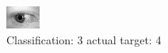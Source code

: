 \begin{figure}[h!]
\begin{center}
\includegraphics[width=0.60\columnwidth]{figures/ID737_class_3_target_4.png}
\end{center}
\caption{ Classification: 3 actual target: 4}
\label{fig:ID737_class_3_target_4}
\end{figure}
